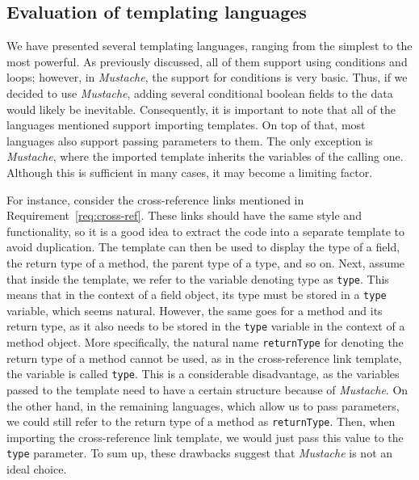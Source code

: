 \subsection*{Evaluation of templating languages}

We have presented several templating languages, ranging from the simplest to the most powerful.
As previously discussed, all of them support using conditions and loops; however, in \textit{Mustache}, the support for conditions is very basic.
Thus, if we decided to use \textit{Mustache}, adding several conditional boolean fields to the data would likely be inevitable.
Consequently, it is important to note that all of the languages mentioned support importing templates. 
On top of that, most languages also support passing parameters to them.
The only exception is \textit{Mustache}, where the imported template inherits the variables of the calling one.
Although this is sufficient in many cases, it may become a limiting factor.

For instance, consider the cross-reference links mentioned in Requirement~\ref{req:cross-ref}.
These links should have the same style and functionality, so it is a good idea to extract the code into a separate template to avoid duplication. 
The template can then be used to display the type of a field, the return type of a method, the parent type of a type, and so on.
Next, assume that inside the template, we refer to the variable denoting type as \texttt{type}.
This means that in the context of a field object, its type must be stored in a \texttt{type} variable, which seems natural.
However, the same goes for a method and its return type, as it also needs to be stored in the \texttt{type} variable in the context of a method object.
More specifically, the natural name \texttt{returnType} for denoting the return type of a method cannot be used, as in the cross-reference link template, the variable is called \texttt{type}.
This is a considerable disadvantage, as the variables passed to the template need to have a certain structure because of \textit{Mustache}.
On the other hand, in the remaining languages, which allow us to pass parameters, we could still refer to the return type of a method as \texttt{returnType}.
Then, when importing the cross-reference link template, we would just pass this value to the \texttt{type} parameter.
To sum up, these drawbacks suggest that \textit{Mustache} is not an ideal choice.

